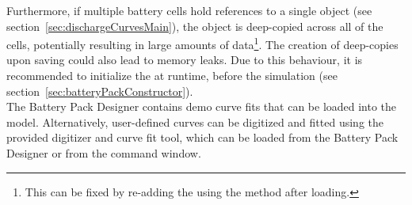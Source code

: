Furthermore, if multiple battery cells hold references to a single  object (see section~\ref{sec:dischargeCurvesMain}), the object is deep-copied across all of the cells, potentially resulting in large amounts of data\footnote{This can be fixed by re-adding the  using the  method after loading.}. The creation of deep-copies upon saving could also lead to memory leaks. Due to this behaviour, it is recommended to initialize the  at runtime, before the simulation (see section~\ref{sec:batteryPackConstructor}).\\
The Battery Pack Designer contains demo curve fits that can be loaded into the model. Alternatively, user-defined curves can be digitized and fitted using the provided digitizer and curve fit tool, which can be loaded from the Battery Pack Designer or from the command window.

